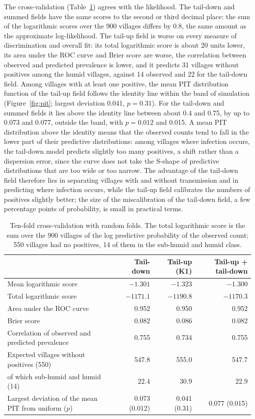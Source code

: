 \documentclass[11pt,a4paper]{article}
\begin{document}
The cross-validation (Table~\ref{tab:cv}) agrees with the likelihood. The tail-down and summed fields have the same scores to the second or third decimal place: the sum of the logarithmic scores over the 900 villages differs by 0.8, the same amount as the approximate log-likelihood. The tail-up field is worse on every measure of discrimination and overall fit: its total logarithmic score is about 20 units lower, its area under the ROC curve and Brier score are worse, the correlation between observed and predicted prevalence is lower, and it predicts 31 villages without positives among the humid villages, against 14 observed and 22 for the tail-down field. Among villages with at least one positive, the mean PIT distribution function of the tail-up field follows the identity line within the band of simulation (Figure~\ref{fig:pit}; largest deviation 0.041, $p = 0.31$). For the tail-down and summed fields it lies above the identity line between about 0.4 and 0.75, by up to 0.073 and 0.077, outside the band, with $p = 0.012$ and 0.015. A mean PIT distribution above the identity means that the observed counts tend to fall in the lower part of their predictive distributions: among villages where infection occurs, the tail-down model predicts slightly too many positives, a shift rather than a dispersion error, since the curve does not take the S-shape of predictive distributions that are too wide or too narrow. The advantage of the tail-down field therefore lies in separating villages with and without transmission and in predicting where infection occurs, while the tail-up field calibrates the numbers of positives slightly better; the size of the miscalibration of the tail-down field, a few percentage points of probability, is small in practical terms.

\begin{table}[H]
\centering
\caption{Ten-fold cross-validation with random folds. The total logarithmic score is the sum over the 900 villages of the log predictive probability of the observed count; 550 villages had no positives, 14 of them in the sub-humid and humid class.}
\label{tab:cv}
\begin{tabular}{lrrr}
\toprule
 & Tail-down & Tail-up (K1) & Tail-up + tail-down \\
\midrule
Mean logarithmic score & $-1.301$ & $-1.323$ & $-1.300$ \\
Total logarithmic score & $-1171.1$ & $-1190.8$ & $-1170.3$ \\
Area under the ROC curve & 0.952 & 0.950 & 0.952 \\
Brier score & 0.082 & 0.086 & 0.082 \\
Correlation of observed and predicted prevalence & 0.755 & 0.734 & 0.755 \\
Expected villages without positives (550) & 547.8 & 555.0 & 547.7 \\
\quad of which sub-humid and humid (14) & 22.4 & 30.9 & 22.9 \\
Largest deviation of the mean PIT from uniform ($p$) & 0.073 (0.012) & 0.041 (0.31) & 0.077 (0.015) \\
\bottomrule
\end{tabular}
\end{table}
\end{document}

